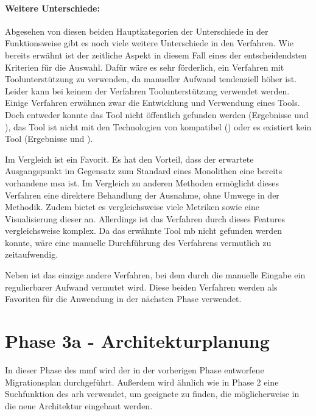 \paragraph{Weitere Unterschiede:} Abgesehen von diesen beiden Hauptkategorien der Unterschiede in der Funktionsweise gibt es noch viele weitere Unterschiede in den Verfahren.
Wie bereits erwähnt ist der zeitliche Aspekt in diesem Fall eines der entscheidendsten Kriterien für die Auswahl.
Dafür wäre es sehr förderlich, ein Verfahren mit Toolunterstützung zu verwenden, da manueller Aufwand tendenziell höher ist.
Leider kann bei keinem der Verfahren Toolunterstützung verwendet werden.
Einige Verfahren erwähnen zwar die Entwicklung und Verwendung eines Tools.
Doch entweder konnte das Tool nicht öffentlich gefunden werden (Ergebnisse  und ), das Tool ist nicht mit den Technologien von \jf kompatibel () oder es existiert kein Tool (Ergebnisse  und ).

Im Vergleich ist  ein Favorit.
Es hat den Vorteil, dass der erwartete Aus\-gangs\-punkt im Gegensatz zum Standard eines Monolithen eine bereits vorhandene \gls{msa} ist.
Im Vergleich zu anderen Methoden ermöglicht dieses Verfahren eine direktere Behandlung der Ausnahme, ohne Umwege in der Methodik.
Zudem bietet es vergleichsweise viele Metriken sowie eine Visualisierung dieser an.
Allerdings ist das Verfahren durch dieses Features vergleichsweise komplex.
Da das erwähnte Tool \gls{mb} nicht gefunden werden konnte, wäre eine manuelle Durchführung des Verfahrens vermutlich zu zeitaufwendig.

Neben  ist  das einzige andere Verfahren, bei dem durch die manuelle Eingabe ein regulierbarer Aufwand vermutet wird.
Diese beiden Verfahren werden als Favoriten für die Anwendung in der nächsten Phase verwendet.

\section{Phase 3a - Architekturplanung}
\label{sec:durchführung-phase3}

In dieser Phase des \acrfull{mmf} wird der in der vorherigen Phase entworfene Migrationsplan durchgeführt.
Außerdem wird ähnlich wie in Phase 2 eine Suchfunktion des \gls{arh} verwendet, um geeignete \bpp zu finden, die möglicherweise in die neue Architektur eingebaut werden.

